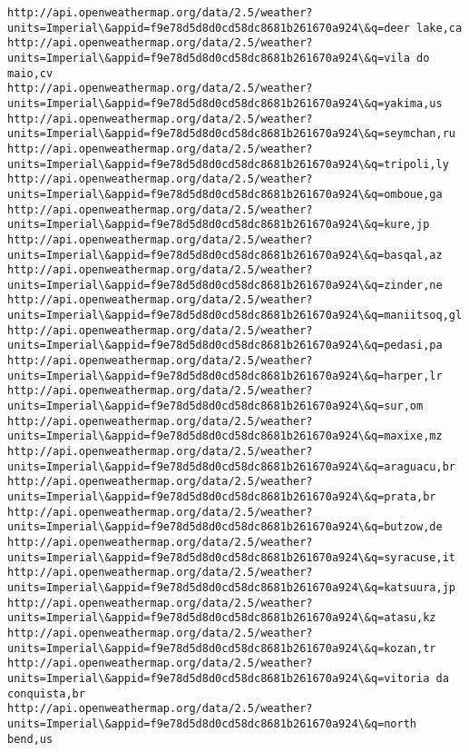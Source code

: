 \documentclass[11pt]{article}
\begin{document}
\begin{Verbatim}[commandchars=\\\{\}]
http://api.openweathermap.org/data/2.5/weather?units=Imperial\&appid=f9e78d5d8d0cd58dc8681b261670a924\&q=deer lake,ca
http://api.openweathermap.org/data/2.5/weather?units=Imperial\&appid=f9e78d5d8d0cd58dc8681b261670a924\&q=vila do maio,cv
http://api.openweathermap.org/data/2.5/weather?units=Imperial\&appid=f9e78d5d8d0cd58dc8681b261670a924\&q=yakima,us
http://api.openweathermap.org/data/2.5/weather?units=Imperial\&appid=f9e78d5d8d0cd58dc8681b261670a924\&q=seymchan,ru
http://api.openweathermap.org/data/2.5/weather?units=Imperial\&appid=f9e78d5d8d0cd58dc8681b261670a924\&q=tripoli,ly
http://api.openweathermap.org/data/2.5/weather?units=Imperial\&appid=f9e78d5d8d0cd58dc8681b261670a924\&q=omboue,ga
http://api.openweathermap.org/data/2.5/weather?units=Imperial\&appid=f9e78d5d8d0cd58dc8681b261670a924\&q=kure,jp
http://api.openweathermap.org/data/2.5/weather?units=Imperial\&appid=f9e78d5d8d0cd58dc8681b261670a924\&q=basqal,az
http://api.openweathermap.org/data/2.5/weather?units=Imperial\&appid=f9e78d5d8d0cd58dc8681b261670a924\&q=zinder,ne
http://api.openweathermap.org/data/2.5/weather?units=Imperial\&appid=f9e78d5d8d0cd58dc8681b261670a924\&q=maniitsoq,gl
http://api.openweathermap.org/data/2.5/weather?units=Imperial\&appid=f9e78d5d8d0cd58dc8681b261670a924\&q=pedasi,pa
http://api.openweathermap.org/data/2.5/weather?units=Imperial\&appid=f9e78d5d8d0cd58dc8681b261670a924\&q=harper,lr
http://api.openweathermap.org/data/2.5/weather?units=Imperial\&appid=f9e78d5d8d0cd58dc8681b261670a924\&q=sur,om
http://api.openweathermap.org/data/2.5/weather?units=Imperial\&appid=f9e78d5d8d0cd58dc8681b261670a924\&q=maxixe,mz
http://api.openweathermap.org/data/2.5/weather?units=Imperial\&appid=f9e78d5d8d0cd58dc8681b261670a924\&q=araguacu,br
http://api.openweathermap.org/data/2.5/weather?units=Imperial\&appid=f9e78d5d8d0cd58dc8681b261670a924\&q=prata,br
http://api.openweathermap.org/data/2.5/weather?units=Imperial\&appid=f9e78d5d8d0cd58dc8681b261670a924\&q=butzow,de
http://api.openweathermap.org/data/2.5/weather?units=Imperial\&appid=f9e78d5d8d0cd58dc8681b261670a924\&q=syracuse,it
http://api.openweathermap.org/data/2.5/weather?units=Imperial\&appid=f9e78d5d8d0cd58dc8681b261670a924\&q=katsuura,jp
http://api.openweathermap.org/data/2.5/weather?units=Imperial\&appid=f9e78d5d8d0cd58dc8681b261670a924\&q=atasu,kz
http://api.openweathermap.org/data/2.5/weather?units=Imperial\&appid=f9e78d5d8d0cd58dc8681b261670a924\&q=kozan,tr
http://api.openweathermap.org/data/2.5/weather?units=Imperial\&appid=f9e78d5d8d0cd58dc8681b261670a924\&q=vitoria da conquista,br
http://api.openweathermap.org/data/2.5/weather?units=Imperial\&appid=f9e78d5d8d0cd58dc8681b261670a924\&q=north bend,us

\end{Verbatim}
\end{document}
